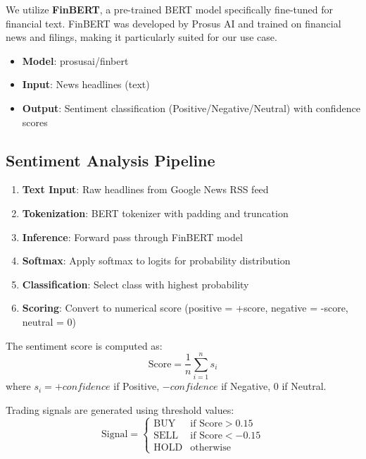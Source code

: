 \documentclass[12pt]{article}
\begin{document}
We utilize \textbf{FinBERT}, a pre-trained BERT model specifically fine-tuned for financial text. FinBERT was developed by Prosus AI and trained on financial news and filings, making it particularly suited for our use case.

\begin{itemize}
\item \textbf{Model}: prosusai/finbert
\item \textbf{Input}: News headlines (text)
\item \textbf{Output}: Sentiment classification (Positive/Negative/Neutral) with confidence scores
\end{itemize}

\subsection{Sentiment Analysis Pipeline}

\begin{enumerate}
\item \textbf{Text Input}: Raw headlines from Google News RSS feed
\item \textbf{Tokenization}: BERT tokenizer with padding and truncation
\item \textbf{Inference}: Forward pass through FinBERT model
\item \textbf{Softmax}: Apply softmax to logits for probability distribution
\item \textbf{Classification}: Select class with highest probability
\item \textbf{Scoring}: Convert to numerical score (positive = +score, negative = -score, neutral = 0)
\end{enumerate}

The sentiment score is computed as:
\begin{equation}
\text{Score} = \frac{1}{n} \sum_{i=1}^{n} s_i
\end{equation}
where $s_i = +confidence$ if Positive, $-confidence$ if Negative, $0$ if Neutral.

Trading signals are generated using threshold values:
\begin{equation}
\text{Signal} = 
\begin{cases}
\text{BUY} & \text{if Score} > 0.15 \\
\text{SELL} & \text{if Score} < -0.15 \\
\text{HOLD} & \text{otherwise}
\end{cases}
\end{equation}
\end{document}
